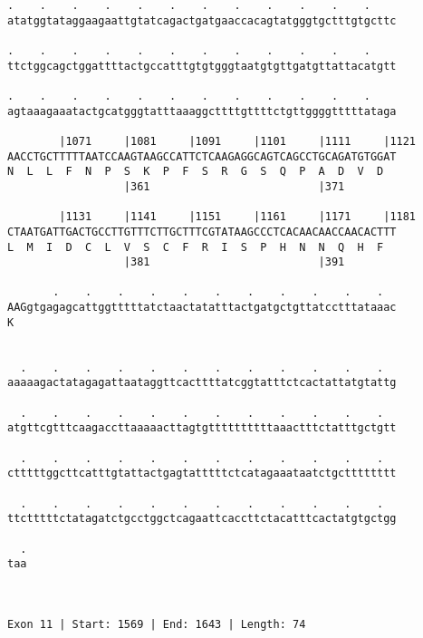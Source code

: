 \documentclass{article}
\begin{document}
\begin{Verbatim}
.    .    .    .    .    .    .    .    .    .    .    .    
atatggtataggaagaattgtatcagactgatgaaccacagtatgggtgctttgtgcttc
                                                            
.    .    .    .    .    .    .    .    .    .    .    .    
ttctggcagctggattttactgccatttgtgtgggtaatgtgttgatgttattacatgtt
                                                            
.    .    .    .    .    .    .    .    .    .    .    .    
agtaaagaaatactgcatgggtatttaaaggcttttgttttctgttggggtttttataga
                                                            
        |1071     |1081     |1091     |1101     |1111     |1121
AACCTGCTTTTTAATCCAAGTAAGCCATTCTCAAGAGGCAGTCAGCCTGCAGATGTGGAT
N  L  L  F  N  P  S  K  P  F  S  R  G  S  Q  P  A  D  V  D  
                  |361                          |371        
  
        |1131     |1141     |1151     |1161     |1171     |1181
CTAATGATTGACTGCCTTGTTTCTTGCTTTCGTATAAGCCCTCACAACAACCAACACTTT
L  M  I  D  C  L  V  S  C  F  R  I  S  P  H  N  N  Q  H  F  
                  |381                          |391        
  
       .    .    .    .    .    .    .    .    .    .    .  
AAGgtgagagcattggtttttatctaactatatttactgatgctgttatcctttataaac
K                                                           
                                                            
  
  .    .    .    .    .    .    .    .    .    .    .    .  
aaaaagactatagagattaataggttcacttttatcggtatttctcactattatgtattg
                                                            
  .    .    .    .    .    .    .    .    .    .    .    .  
atgttcgtttcaagaccttaaaaacttagtgttttttttttaaactttctatttgctgtt
                                                            
  .    .    .    .    .    .    .    .    .    .    .    .  
ctttttggcttcatttgtattactgagtatttttctcatagaaataatctgctttttttt
                                                            
  .    .    .    .    .    .    .    .    .    .    .    .  
ttctttttctatagatctgcctggctcagaattcaccttctacatttcactatgtgctgg
                                                            
  .
taa
   
   
 
Exon 11 | Start: 1569 | End: 1643 | Length: 74




\end{Verbatim}
\end{document}

